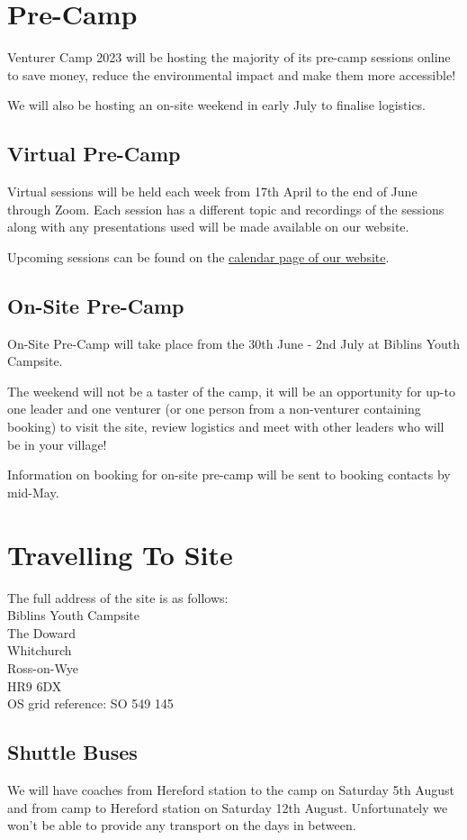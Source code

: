 \documentclass[a4paper, 11pt]{report}
\newcommand{\nl}{\newline}
\begin{document}
\chapter{Pre-Camp}
Venturer Camp 2023 will be hosting the majority of its pre-camp sessions online to save money, reduce the environmental impact and make them more accessible!\nl

We will also be hosting an on-site weekend in early July to finalise logistics.

\section{Virtual Pre-Camp}
Virtual sessions will be held each week from 17th April to the end of June through Zoom. Each session has a different topic and recordings of the sessions along with any presentations used will be made available on our website.\nl 

Upcoming sessions can be found on the \href{https://venturercamp.org.uk/calendar/}{calendar page of our website}.

\section{On-Site Pre-Camp}
On-Site Pre-Camp will take place from the 30th June - 2nd July at Biblins Youth Campsite. \nl

The weekend will not be a taster of the camp, it will be an opportunity for up-to one leader and one venturer (or one person from a non-venturer containing booking) to visit the site, review logistics and meet with other leaders who will be in your village!\nl

Information on booking for on-site pre-camp will be sent to booking contacts by mid-May. 

\chapter{Travelling To Site}
The full address of the site is as follows:\\
Biblins Youth Campsite\\
The Doward\\
Whitchurch\\
Ross-on-Wye\\
HR9 6DX\\
OS grid reference: SO 549 145

\section{Shuttle Buses}
We will have coaches from Hereford station to the camp on Saturday 5th August and from camp to Hereford station on Saturday 12th August. Unfortunately we won't be able to provide any transport on the days in between.\nl
\end{document}
